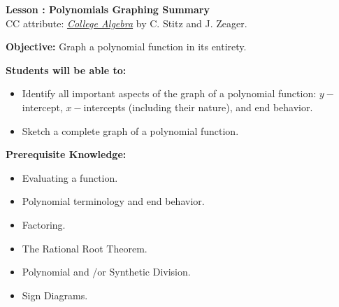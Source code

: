 \documentclass[12pt]{article}
\theoremstyle{definition}
\begin{document}
{\bf \large Lesson : Polynomials Graphing Summary}
\\ CC attribute: \href{http://www.stitz-zeager.com}{\it{College Algebra}} by C. Stitz and J. Zeager. 
\hfill \doclicenseImage[imagewidth=5em]\\
\par
{\bf Objective:} Graph a polynomial function in its entirety.\\
\par
{\bf Students will be able to:}
\begin{itemize}
	\item Identify all important aspects of the graph of a polynomial function: $y-$intercept, $x-$intercepts (including their nature), and end behavior.
	\item Sketch a complete graph of a polynomial function.
\end{itemize}
{\bf Prerequisite Knowledge:}
\begin{itemize}
	\item Evaluating a function.
	\item Polynomial terminology and end behavior.
	\item Factoring.
	\item The Rational Root Theorem.
	\item Polynomial and \slash or Synthetic Division.
	\item Sign Diagrams.
\end{itemize}
\hrulefill
\end{document}
